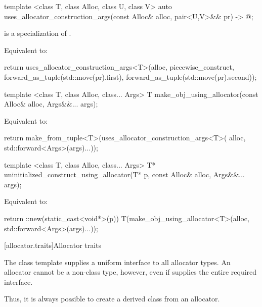 %
\begin{itemdecl}
template <class T, class Alloc, class U, class V>
  auto uses_allocator_construction_args(const Alloc& alloc, pair<U,V>&& pr) -> @\seebelow@;
\end{itemdecl}

\begin{itemdescr}
\pnum
\constraints
{} is a specialization of .

\pnum
\effects
Equivalent to:
\begin{codeblock}
return uses_allocator_construction_args<T>(alloc, piecewise_construct,
                                           forward_as_tuple(std::move(pr).first),
                                           forward_as_tuple(std::move(pr).second));
\end{codeblock}
\end{itemdescr}

%
\begin{itemdecl}
template <class T, class Alloc, class... Args>
  T make_obj_using_allocator(const Alloc& alloc, Args&&... args);
\end{itemdecl}

\begin{itemdescr}
\pnum
\effects
Equivalent to:
\begin{codeblock}
return make_from_tuple<T>(uses_allocator_construction_args<T>(
                            alloc, std::forward<Args>(args)...));
\end{codeblock}
\end{itemdescr}

%
\begin{itemdecl}
template <class T, class Alloc, class... Args>
  T* uninitialized_construct_using_allocator(T* p, const Alloc& alloc, Args&&... args);
\end{itemdecl}

\begin{itemdescr}
\pnum
\effects
Equivalent to:
\begin{codeblock}
return ::new(static_cast<void*>(p))
  T(make_obj_using_allocator<T>(alloc, std::forward<Args>(args)...));
\end{codeblock}
\end{itemdescr}

[allocator.traits]{Allocator traits}

\pnum
The class template  supplies a uniform interface to all
allocator types.
An allocator cannot be a non-class type, however, even if 
supplies the entire required interface. \begin{note} Thus, it is always possible to create
a derived class from an allocator. \end{note}


